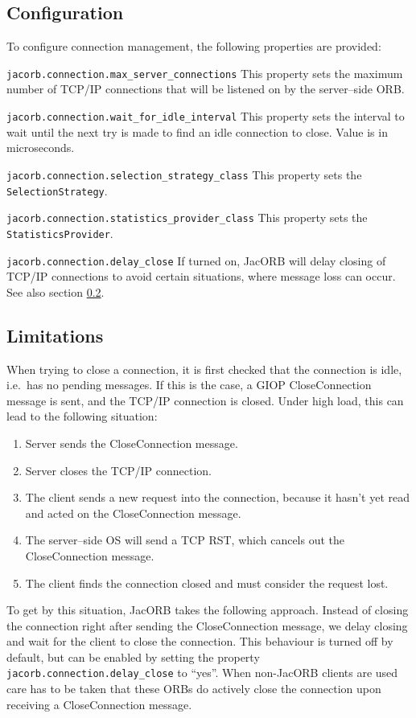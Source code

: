 \subsection{Configuration}
\label{connection_management_config}
To configure connection management, the following properties are provided:
\begin{description}
\item {\tt jacorb.connection.max\_server\_connections} This property sets the
  maximum number of TCP/IP connections that will be listened on by the
  server--side ORB.
\item {\tt jacorb.connection.wait\_for\_idle\_interval} This property sets the
  interval to wait until the next try is made to find an idle connection to
  close. Value is in microseconds.
\item {\tt jacorb.connection.selection\_strategy\_class} This property sets
  the {\tt Selection\-Strategy}.
\item {\tt jacorb.connection.statistics\_provider\_class} This property sets
  the {\tt Statistics\-Provider}.
\item {\tt jacorb.connection.delay\_close} If turned on, JacORB will delay
  closing of TCP/IP connections to avoid certain situations, where message
  loss can occur. See also section \ref{connection_management_limitations}.
\end{description}

\subsection{Limitations}
\label{connection_management_limitations}
When trying to close a connection, it is first checked that the connection is
idle, i.e.~has no pending messages.  If this is the case, a GIOP
CloseConnection message is sent, and the TCP/IP connection is closed. Under
high load, this can lead to the following situation:

\begin{enumerate}
\item Server sends the CloseConnection message.
\item Server closes the TCP/IP connection.
\item The client sends a new request into the connection, because it hasn't
  yet read and acted on the CloseConnection message.
\item The server--side OS will send a TCP RST, which cancels out the
  CloseConnection message.
\item The client finds the connection closed and must consider the request lost.
\end{enumerate}

To get by this situation, JacORB takes the following approach. Instead
of closing the connection right after sending the CloseConnection
message, we delay closing and wait for the client to close the
connection. This behaviour is turned off by default, but can be
enabled by setting the property {\tt jacorb.connection.delay\_close}
to ``yes''. When non-JacORB clients are used care has to be taken that
these ORBs do actively close the connection upon receiving a
CloseConnection message.


